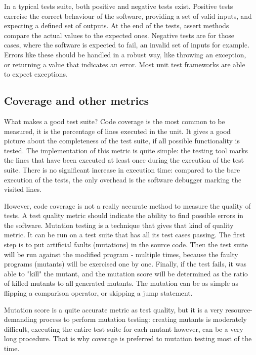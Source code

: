In a typical tests suite, both positive and negative tests exist. Positive tests exercise the correct behaviour of the software, providing a set of valid inputs, and expecting a defined set of outputs. At the end of the tests, assert methods compare the actual values to the expected ones. Negative tests are for those cases, where the software is expected to fail, an invalid set of inputs for example. Errors like these should be handled in a robust way, like throwing an exception, or returning a value that indicates an error. Most unit test frameworks are able to expect exceptions. \cite{Olan:2003:UTT:948785.948830}

\subsection{Coverage and other metrics}
What makes a good test suite? Code coverage is the most common to be measured, it is the percentage of lines executed in the unit. It gives a good picture about the completeness of the test suite, if all possible functionality is tested. The implementation of this metric is quite simple: the testing tool marks the lines that have been executed at least once during the execution of the test suite. There is no significant increase in execution time: compared to the bare execution of the tests, the only overhead is the software debugger marking the visited lines.

However, code coverage is not a really accurate method to measure the quality of tests. A test quality metric should indicate the ability to find possible errors in the software. Mutation testing is a technique that gives that kind of quality metric. It can be run on a test suite that has all its test cases passing. The first step is to put artificial faults (mutations) in the source code. Then the test suite will be run against the modified program - multiple times, because the faulty programs (mutants) will be exercised one by one. Finally, if the test fails, it was able to "kill" the mutant, and the mutation score will be determined as the ratio of killed mutants to all generated mutants. The mutation can be as simple as flipping a comparison operator, or skipping a jump statement. \cite{5487526, aron_mut}

Mutation score is a quite accurate metric as test quality, but it is a very resource-demanding process to perform mutation testing: creating mutants is moderately difficult, executing the entire test suite for each mutant however, can be a very long procedure. That is why coverage is preferred to mutation testing most of the time.

